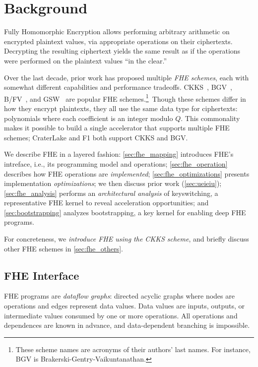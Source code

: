 \chapter{Background}\label{sec:background}

Fully Homomorphic Encryption allows performing arbitrary
arithmetic on encrypted plaintext values, via appropriate operations
on their ciphertexts. Decrypting the resulting ciphertext yields the
same result as if the operations were performed on the plaintext
values ``in the clear.''

Over the last decade, prior work has proposed multiple \emph{FHE schemes}, each
with somewhat different capabilities and performance tradeoffs.
CKKS~\cite{cheon:ictaci17:homomorphic}, BGV~\cite{brakerski:toct14:leveled},
B/FV~\cite{brakerski:crypto12:fully,fan:iacr12:somewhat}, and
GSW~\cite{gentry:crypto13:homomorphic} are popular FHE schemes.\footnote{These
scheme names are acronyms of their authors' last names. For instance, BGV is
Brakerski-Gentry-Vaikuntanathan.}~Though these schemes differ in how they
encrypt plaintexts, they all use the same data type for ciphertexts:
polynomials where each coefficient is an integer modulo $Q$. This commonality
makes it possible to build a single accelerator that supports multiple FHE
schemes; CraterLake and F1 both support CKKS and BGV.

We describe FHE in a layered fashion: \autoref{sec:fhe_mapping} introduces
FHE's intreface, i.e., its programming model and operations;
\autoref{sec:fhe_operation} describes how FHE operations are
\emph{implemented}; \autoref{sec:fhe_optimizations} presents implementation
\emph{optimizations}; we then discuss prior work (\autoref{sec:ueieiu});
\autoref{sec:fhe_analysis} performs an \emph{architectural analysis} of
keyswitching, a representative FHE kernel to reveal acceleration opportunities;
and \autoref{sec:bootstrapping} analyzes bootstrapping, a key kernel for
enabling deep FHE programs.

For concreteness, we \emph{introduce FHE using the CKKS scheme}, and briefly
discuss other FHE schemes in \autoref{sec:fhe_others}.

\section{FHE Interface}
\label{sec:fhe_mapping}

FHE programs are \emph{dataflow graphs}: directed acyclic graphs where nodes
are operations and edges represent data values. Data values are inputs,
outputs, or intermediate values consumed by one or more operations. All
operations and dependences are known in advance, and data-dependent branching
is impossible.

